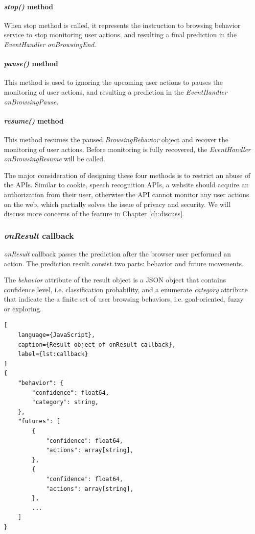 \paragraph{\emph{stop()} method} When stop method is called, it represents the instruction
to browsing behavior service to stop monitoring user actions, and resulting a final 
prediction in the \emph{EventHandler onBrowsingEnd}.

\paragraph{\emph{pause()} method} This method is used to ignoring the upcoming user actions
to pauses the monitoring of user actions, and resulting a prediction in the 
\emph{EventHandler onBrowsingPause}.

\paragraph{\emph{resume()} method} This method resumes the paused \emph{BrowsingBehavior}
object and recover the monitoring of user actions. Before monitoring is fully recovered,
the \emph{EventHandler onBrowsingResume} will be called.

The major consideration of designing these four methods is to restrict an abuse of the APIs.
Similar to cookie, speech recognition APIs, a website should acquire an authorization from
their user, otherwise the API cannot monitor any user actions on the web, which partially
solves the issue of privacy and security. We will discuss more concerns of the feature in
Chapter \ref{ch:discuss}.

\subsubsection{\emph{onResult} callback}

\emph{onResult} callback passes the prediction after the browser user performed an action.
The prediction result consist two parts: behavior and future movements.

The \emph{behavior} attribute of the result object is a JSON object that contains 
confidence level, i.e. classification probability, and a enumerate \emph{category} attribute
that indicate the a finite set of user browsing behaviors, i.e. goal-oriented, fuzzy or exploring.

\begin{lstlisting}[
    language={JavaScript},
    caption={Result object of onResult callback},
    label={lst:callback}
]
{
    "behavior": {
        "confidence": float64,
        "category": string,
    },
    "futures": [
        {
            "confidence": float64,
            "actions": array[string],
        },
        {
            "confidence": float64,
            "actions": array[string],
        },
        ...
    ]
}
\end{lstlisting}

